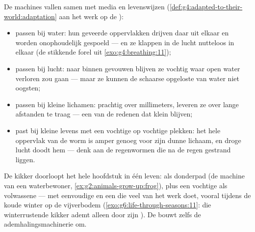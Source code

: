 \begin{proposition}\label{prop:g7:how-animals-breathe:fits}
De machines vallen samen met media en levenswijzen
(\cref{def:g4:adapted-to-their-world:adaptation} aan het werk op de
):
\begin{itemize}
  \item {} passen bij water: hun geveerde oppervlakken drijven daar
        uit elkaar en worden onophoudelijk gespoeld --- en ze klappen in
        de lucht nutteloos in elkaar (de stikkende forel uit
        \cref{exo:g4:breathing:11});
  \item {} passen bij lucht: naar binnen gevouwen blijven ze vochtig
        waar open water verloren zou gaan --- maar ze kunnen de schaarse
        opgeloste  van water niet oogsten;
  \item {} passen bij kleine lichamen: prachtig over millimeters,
        leveren ze over lange afstanden te traag --- een van de redenen
        dat  klein blijven;
  \item {} past bij kleine levens met een vochtige  op
        vochtige plekken: het hele oppervlak van de worm is amper genoeg
        voor zijn dunne lichaam, en droge lucht doodt hem --- denk aan de
        regenwormen die na de regen gestrand liggen.
\end{itemize}
\end{proposition}
\admitted

\begin{example}\label{ex:g7:how-animals-breathe:frog}
De kikker doorloopt het hele hoofdstuk in één leven:  als
donderpad (de machine van een waterbewoner,
\cref{ex:g2:animals-grow-up:frog}),  plus een vochtige  als
volwassene --- met eenvoudige  en een  die veel van het werk
doet, vooral tijdens de koude winter op de vijverbodem
(\cref{exo:g6:life-through-seasons:11}: die winterrustende kikker ademt
alleen door zijn ). De  bouwt zelfs de
ademhalingsmachinerie om.
\end{example}

